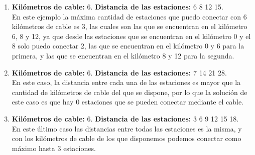 \documentclass[10pt, a4paper]{article}
\begin{document}
\begin{enumerate}
	\item \textbf{Kil\'ometros de cable:} 6. \textbf{Distancia de las estaciones:} 6 8 12 15.\\
	En este ejemplo la m\'axima cantidad de estaciones que puedo conectar con 6 kil\'ometros de cable es 3, las cuales son las que se encuentran en el kil\'ometro 6, 8 y 12, ya que desde las estaciones que se encuentran en el kil\'ometro 0 y el 8 solo puedo conectar 2, las que se encuentran en el kil\'ometro 0 y 6 para la primera, y las que se encuentran en el kil\'ometro 8 y 12 para la segunda.
	\item \textbf{Kil\'ometros de cable:} 6. \textbf{Distancia de las estaciones:} 7 14 21 28.\\
	En este caso, la distancia entre cada una de las estaciones es mayor que la cantidad de kil\'ometros de cable del que se dispone, por lo que la soluci\'on de este caso es que hay 0 estaciones que se pueden conectar mediante el cable.
	\item \textbf{Kil\'ometros de cable:} 6. \textbf{Distancia de las estaciones:} 3 6 9 12 15 18.\\
	En este \'ultimo caso las distancias entre todas las estaciones es la misma, y con los kil\'ometros de cable de los que disponemos podemos conectar como m\'aximo hasta 3 estaciones.
	
\end{enumerate}
\end{document}
